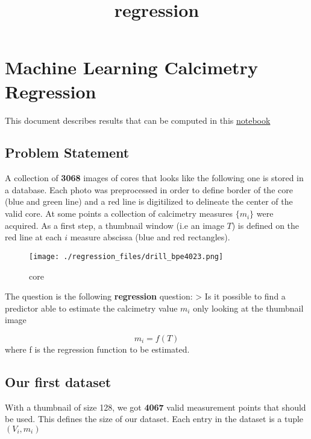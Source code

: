 \documentclass[11pt]{article}
\title{regression}
\begin{document}
    
    \maketitle
    
    

    
    \hypertarget{machine-learning-calcimetry-regression}{%
\section{Machine Learning Calcimetry
Regression}\label{machine-learning-calcimetry-regression}}

This document describes results that can be computed in this
\href{../notebooks/regression.ipynb}{notebook}

\hypertarget{problem-statement}{%
\subsection{Problem Statement}\label{problem-statement}}

A collection of \textbf{3068} images of cores that looks like the
following one is stored in a database. Each photo was preprocessed in
order to define border of the core (blue and green line) and a red line
is digitilized to delineate the center of the valid core. At some points
a collection of calcimetry measures \(\{m_i\}\) were acquired. As a
first step, a thumbnail window (i.e an image \(T\)) is defined on the
red line at each \(i\) measure abscissa (blue and red rectangles).

\begin{figure}
\centering
\texttt{[image: ./regression\_files/drill\_bpe4023.png]}
\caption{core}
\end{figure}

The question is the following \textbf{regression} question:
\textgreater{} Is it possible to find a predictor able to estimate the
calcimetry value \(m_i\) only looking at the thumbnail image

\[
m_i = f(T)
\] where f is the regression function to be estimated.

\hypertarget{our-first-dataset}{%
\subsection{Our first dataset}\label{our-first-dataset}}

With a thumbnail of size 128, we got \textbf{4067} valid measurement
points that should be used. This defines the size of our dataset. Each
entry in the dataset is a tuple \((V_i, m_i)\)
\end{document}
